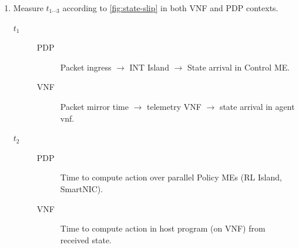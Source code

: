 \documentclass[sigconf,natbib=false]{acmart}
\begin{document}
\begin{appendices}
\begin{itemize}
\begin{enumerate}
			\item Measure $t_{1 \cdots 3}$ according to \cref{fig:state-slip} in both VNF and PDP contexts.
			\begin{description}
				\item[$t_1$]
				\begin{description}
					\item[PDP] Packet ingress $\rightarrow$ INT Island $\rightarrow$ State arrival in Control ME.
					\item[VNF] Packet mirror time $\rightarrow$ telemetry VNF $\rightarrow$ state arrival in agent vnf.
				\end{description}
				
				\item[$t_2$]
				\begin{description}
					\item[PDP] Time to compute action over parallel Policy MEs (RL Island, SmartNIC).
					\item[VNF] Time to compute action in host program (on VNF) from received state.
				\end{description}
				

\end{description}
\end{enumerate}
\end{itemize}
\end{appendices}
\end{document}
